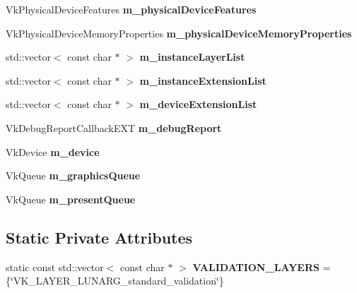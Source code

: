 \begin{DoxyCompactItemize}
Vk\+Physical\+Device\+Features {\bfseries m\+\_\+physical\+Device\+Features}
\item 
\mbox{\label{class_flounder_1_1_display_a3bd5bca28620a2098474cfc6258e47f3}} 
Vk\+Physical\+Device\+Memory\+Properties {\bfseries m\+\_\+physical\+Device\+Memory\+Properties}
\item 
\mbox{\label{class_flounder_1_1_display_abdad960ac0ccaf7296975cc7c62a385d}} 
std\+::vector$<$ const char $\ast$ $>$ {\bfseries m\+\_\+instance\+Layer\+List}
\item 
\mbox{\label{class_flounder_1_1_display_a84e41b2dc03cbde77989d5c4c0a3abdf}} 
std\+::vector$<$ const char $\ast$ $>$ {\bfseries m\+\_\+instance\+Extension\+List}
\item 
\mbox{\label{class_flounder_1_1_display_a70662a380b097c268182d51a7cc3952d}} 
std\+::vector$<$ const char $\ast$ $>$ {\bfseries m\+\_\+device\+Extension\+List}
\item 
\mbox{\label{class_flounder_1_1_display_aa4c73f82fee1122fcda5e88dab584d74}} 
Vk\+Debug\+Report\+Callback\+E\+XT {\bfseries m\+\_\+debug\+Report}
\item 
\mbox{\label{class_flounder_1_1_display_a9663df1c4ce8857bf34bcf663039d429}} 
Vk\+Device {\bfseries m\+\_\+device}
\item 
\mbox{\label{class_flounder_1_1_display_a725c345d97cfbd5b51e41a9491258bec}} 
Vk\+Queue {\bfseries m\+\_\+graphics\+Queue}
\item 
\mbox{\label{class_flounder_1_1_display_a4acd0627d36f8d3f0f127fd543b62a56}} 
Vk\+Queue {\bfseries m\+\_\+present\+Queue}
\end{DoxyCompactItemize}
\subsection*{Static Private Attributes}
\begin{DoxyCompactItemize}
\item 
\mbox{\label{class_flounder_1_1_display_a665655afeff16c47a88ec4a09d82a795}} 
static const std\+::vector$<$ const char $\ast$ $>$ {\bfseries V\+A\+L\+I\+D\+A\+T\+I\+O\+N\+\_\+\+L\+A\+Y\+E\+RS} = \{\char`\"{}V\+K\+\_\+\+L\+A\+Y\+E\+R\+\_\+\+L\+U\+N\+A\+R\+G\+\_\+standard\+\_\+validation\char`\"{}\}
\end{DoxyCompactItemize}
